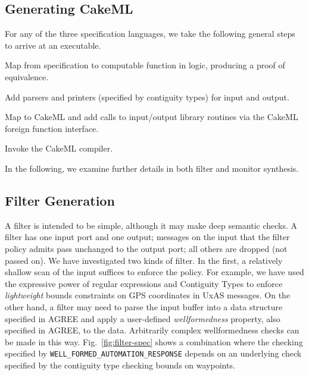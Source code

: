 \documentclass[global,twocolumn]{svjour}
\newcommand{\figref}[1]{Fig.~\ref{#1}}
\newcommand{\ckml}{CakeML}
\begin{document}

\subsection{Generating \ckml}
For any of the three specification languages, we take the following general steps to arrive at an executable.
%
\begin{compactenum}
\item Map from specification to computable function in logic, producing a proof of equivalence.
\item Add parsers and printers (specified by contiguity types) for input and output.
\item Map to CakeML and add calls to input/output library routines via the CakeML foreign function interface.
\item Invoke the CakeML compiler.
\end{compactenum}
%
In the following, we examine further details in both filter and monitor synthesis.


\subsection{Filter Generation}

A filter is intended to be simple, although it may make deep semantic checks.
%
A filter has one input port and one output; messages on the input that the filter policy admits pass unchanged to the output port;
%
all others are dropped (not passed on).
%
We have investigated two kinds of filter.
%
In the first, a relatively shallow scan of the input suffices to enforce the policy.
%
For example, we have used the expressive power of regular expressions and Contiguity Types \cite{contiguity-types} to enforce \emph{lightweight} bounds constraints on GPS coordinates in UxAS messages.
%
On the other hand, a filter may need to parse the input buffer into a data structure specified in AGREE and apply a user-defined \emph{wellformedness} property, also specified in AGREE, to the data.
%
Arbitrarily complex wellformedness checks can be made in this way.
%
\figref{fig:filter-spec} shows a combination where the checking specified by {\small\verb+WELL_FORMED_AUTOMATION_RESPONSE+} depends on an underlying check specified by the contiguity type checking bounds on waypoints.
\end{document}
